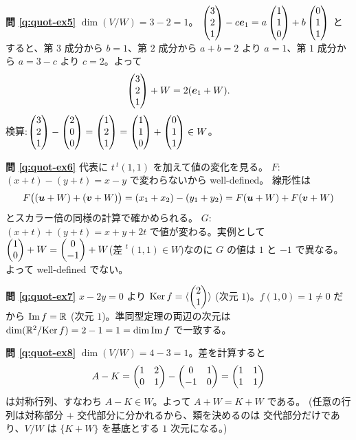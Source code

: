 \bigskip
\noindent\textbf{問 \ref{q:quot-ex5}}\quad
$\dim(V/W) = 3 - 2 = 1$。
$\begin{pmatrix}3 \\ 2 \\ 1\end{pmatrix} - c\bm{e}_1 = a\begin{pmatrix}1 \\ 1 \\ 0\end{pmatrix} + b\begin{pmatrix}0 \\ 1 \\ 1\end{pmatrix}$
とすると、第 $3$ 成分から $b = 1$、第 $2$ 成分から $a + b = 2$ より
$a = 1$、第 $1$ 成分から $a = 3 - c$ より $c = 2$。よって
\[
\begin{pmatrix}3 \\ 2 \\ 1\end{pmatrix} + W = 2(\bm{e}_1 + W).
\]
検算:$\begin{pmatrix}3 \\ 2 \\ 1\end{pmatrix} - \begin{pmatrix}2 \\ 0 \\ 0\end{pmatrix} = \begin{pmatrix}1 \\ 2 \\ 1\end{pmatrix}
= \begin{pmatrix}1 \\ 1 \\ 0\end{pmatrix} + \begin{pmatrix}0 \\ 1 \\ 1\end{pmatrix} \in W$。

\bigskip
\noindent\textbf{問 \ref{q:quot-ex6}}\quad
代表に $t\,{}^t(1, 1)$ を加えて値の変化を見る。
$F$:$(x + t) - (y + t) = x - y$ で変わらないから well-defined。
線形性は
\[
F\bigl((\bm{u} + W) + (\bm{v} + W)\bigr)
= (x_1 + x_2) - (y_1 + y_2) = F(\bm{u} + W) + F(\bm{v} + W)
\]
とスカラー倍の同様の計算で確かめられる。
$G$:$(x + t) + (y + t) = x + y + 2t$ で値が変わる。実例として
$\begin{pmatrix}1 \\ 0\end{pmatrix} + W = \begin{pmatrix}0 \\ -1\end{pmatrix} + W$(差 ${}^t(1,1) \in W$)なのに
$G$ の値は $1$ と $-1$ で異なる。よって well-defined でない。

\bigskip
\noindent\textbf{問 \ref{q:quot-ex7}}\quad
$x - 2y = 0$ より $\mathrm{Ker}\,f = \langle \begin{pmatrix}2 \\ 1\end{pmatrix} \rangle$
(次元 $1$)。$f(1, 0) = 1 \neq 0$ だから $\mathrm{Im}\,f = \mathbb{R}$
(次元 $1$)。準同型定理の両辺の次元は
$\dim(\mathbb{R}^2/\mathrm{Ker}\,f) = 2 - 1 = 1 = \dim \mathrm{Im}\,f$ で一致する。

\bigskip
\noindent\textbf{問 \ref{q:quot-ex8}}\quad
$\dim(V/W) = 4 - 3 = 1$。差を計算すると
\[
A - K = \begin{pmatrix}1 & 2 \\ 0 & 1\end{pmatrix} - \begin{pmatrix}0 & 1 \\ -1 & 0\end{pmatrix}
= \begin{pmatrix}1 & 1 \\ 1 & 1\end{pmatrix}
\]
は対称行列、すなわち $A - K \in W$。よって $A + W = K + W$ である。
(任意の行列は対称部分 $+$ 交代部分に分かれるから、類を決めるのは
交代部分だけであり、$V/W$ は $\{K + W\}$ を基底とする $1$ 次元になる。)

